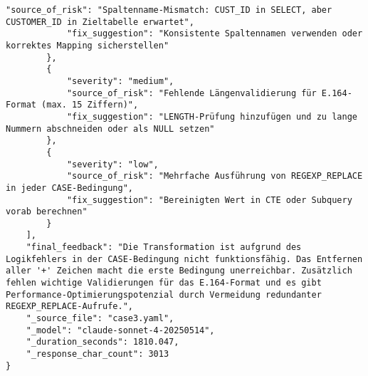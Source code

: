 \begin{lstlisting}[caption={Ausgabe: Claude Sonnet 4 Anwendungsfall 3 Konsistenzdurchlauf},label={claude_case3_prompt2}]
            "source_of_risk": "Spaltenname-Mismatch: CUST_ID in SELECT, aber CUSTOMER_ID in Zieltabelle erwartet",
            "fix_suggestion": "Konsistente Spaltennamen verwenden oder korrektes Mapping sicherstellen"
        },
        {
            "severity": "medium",
            "source_of_risk": "Fehlende Längenvalidierung für E.164-Format (max. 15 Ziffern)",
            "fix_suggestion": "LENGTH-Prüfung hinzufügen und zu lange Nummern abschneiden oder als NULL setzen"
        },
        {
            "severity": "low",
            "source_of_risk": "Mehrfache Ausführung von REGEXP_REPLACE in jeder CASE-Bedingung",
            "fix_suggestion": "Bereinigten Wert in CTE oder Subquery vorab berechnen"
        }
    ],
    "final_feedback": "Die Transformation ist aufgrund des Logikfehlers in der CASE-Bedingung nicht funktionsfähig. Das Entfernen aller '+' Zeichen macht die erste Bedingung unerreichbar. Zusätzlich fehlen wichtige Validierungen für das E.164-Format und es gibt Performance-Optimierungspotenzial durch Vermeidung redundanter REGEXP_REPLACE-Aufrufe.",
    "_source_file": "case3.yaml",
    "_model": "claude-sonnet-4-20250514",
    "_duration_seconds": 1810.047,
    "_response_char_count": 3013
}
\end{lstlisting}

